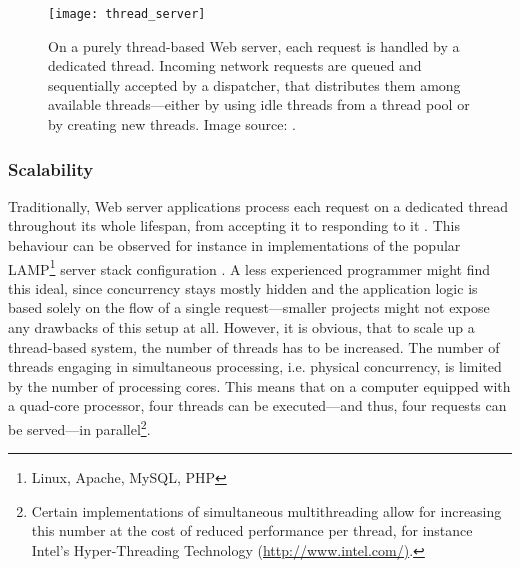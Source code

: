 \begin{figure}
\centering\small
\setlength{\tabcolsep}{0mm}
  \texttt{[image: thread\_server]}
\caption{
On a purely thread-based Web server, each request is handled by a dedicated thread. Incoming network requests are queued and sequentially accepted by a dispatcher, that distributes them among available threads---either by using idle threads from a thread pool or by creating new threads. Image source: \cite{Welsh2001}.
}
\label{fig:thread_server}
\end{figure}

\subsubsection*{Scalability}
Traditionally, Web server applications process each request on a dedicated thread throughout its whole lifespan, from accepting it to responding to it \cite[p. 162]{Henderson2006}. This behaviour can be observed for instance in implementations of the popular LAMP\footnote{Linux, Apache, MySQL, PHP} server stack configuration \cite[p. 48]{Henderson2006}. A less experienced programmer might find this ideal, since concurrency stays mostly hidden and the application logic is based solely on the flow of a single request---smaller projects might not expose any drawbacks of this setup at all. However, it is obvious, that to scale up a thread-based system, the number of threads has to be increased. The number of threads engaging in simultaneous processing, i.e. physical concurrency, is limited by the number of processing cores. This means that on a computer equipped with a quad-core processor, four threads can be executed---and thus, four requests can be served---in parallel\footnote{\label{lab:hyper}Certain implementations of simultaneous multithreading allow for increasing this number at the cost of reduced performance per thread, for instance Intel's Hyper-Threading Technology (\url{http://www.intel.com/)}.}.

